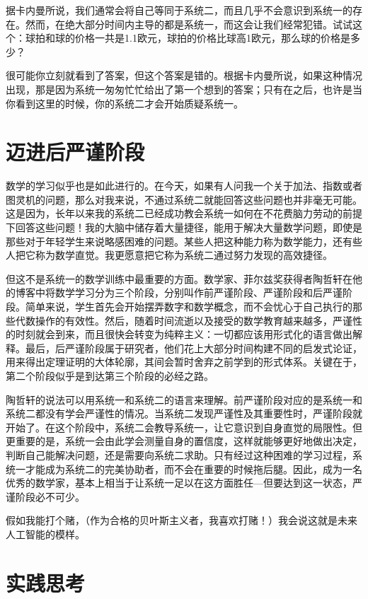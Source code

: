 据卡内曼所说，我们通常会将自己等同于系统二，而且几乎不会意识到系统一的存在。然而，在绝大部分时间内主导的都是系统一，而这会让我们经常犯错。试试这个：球拍和球的价格一共是1.1欧元，球拍的价格比球高1欧元，那么球的价格是多少？

很可能你立刻就看到了答案，但这个答案是错的。根据卡内曼所说，如果这种情况出现，那是因为系统一匆匆忙忙给出了第一个想到的答案；只有在之后，也许是当你看到这里的时候，你的系统二才会开始质疑系统一。

\section{迈进后严谨阶段}

数学的学习似乎也是如此进行的。在今天，如果有人问我一个关于加法、指数或者图灵机的问题，那么对我来说，不通过系统二就能回答这些问题也并非毫无可能。这是因为，长年以来我的系统二已经成功教会系统一如何在不花费脑力劳动的前提下回答这些问题！我的大脑中储存着大量捷径，能用于解决大量数学问题，即使是那些对于年轻学生来说略感困难的问题。某些人把这种能力称为数学能力，还有些人把它称为数学直觉。我更愿意把它称为系统二通过努力发现的高效捷径。

但这不是系统一的数学训练中最重要的方面。数学家、菲尔兹奖获得者陶哲轩在他的博客中将数学学习分为三个阶段，分别叫作前严谨阶段、严谨阶段和后严谨阶段。简单来说，学生首先会开始摆弄数字和数学概念，而不会忧心于自己执行的那些代数操作的有效性。然后，随着时间流逝以及接受的数学教育越来越多，严谨性的时刻就会到来，而且很快会转变为纯粹主义：一切都应该用形式化的语言做出解释。最后，后严谨阶段属于研究者，他们花上大部分时间构建不同的启发式论证，用来得出定理证明的大体轮廓，其间会暂时舍弃之前学到的形式体系。关键在于，第二个阶段似乎是到达第三个阶段的必经之路。

陶哲轩的说法可以用系统一和系统二的语言来理解。前严谨阶段对应的是系统一和系统二都没有学会严谨性的情况。当系统二发现严谨性及其重要性时，严谨阶段就开始了。在这个阶段中，系统二会教导系统一，让它意识到自身直觉的局限性。但更重要的是，系统一会由此学会测量自身的置信度，这样就能够更好地做出决定，判断自己能解决问题，还是需要向系统二求助。只有经过这种困难的学习过程，系统一才能成为系统二的完美协助者，而不会在重要的时候拖后腿。因此，成为一名优秀的数学家，基本上相当于让系统一足以在这方面胜任---但要达到这一状态，严谨阶段必不可少。

假如我能打个赌，（作为合格的贝叶斯主义者，我喜欢打赌！）我会说这就是未来人工智能的模样。

\section{实践思考}

